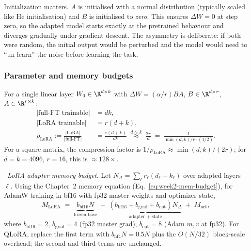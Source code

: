 Initialization matters. $A$ is initialised with a normal distribution
(typically scaled like He initialisation) and $B$ is initialised to
\emph{zero}. This ensures $\Delta W = 0$ at step zero, so the
adapted model starts exactly at the pretrained behaviour and
diverges gradually under gradient descent. The asymmetry is deliberate:
if both were random, the initial output would be perturbed and the
model would need to ``un-learn'' the noise before learning the task.

\subsubsection{Parameter and memory budgets}

\begin{derivation}
For a single linear layer $W_0 \in \R^{d\times k}$ with
$\Delta W = (\alpha/r) BA$, $B \in \R^{d\times r}$, $A \in \R^{r\times k}$:
\begin{align*}
  |\text{full-FT trainable}| &= dk, \\
  |\text{LoRA trainable}| &= r(d+k), \\
  \rho_{\mathrm{LoRA}} := \frac{|\text{LoRA}|}{|\text{full-FT}|}
  &= \frac{r(d+k)}{dk}
     \;\stackrel{d \approx k}{\approx}\; \frac{2r}{d}
     \;=\; \frac{1}{\min(d,k)/r \cdot (1/2)}.
\end{align*}
For a square matrix, the compression factor is
$1/\rho_{\mathrm{LoRA}} \approx \min(d,k)/(2r)$; for
$d=k=4096$, $r=16$, this is $\approx 128\times$.
\end{derivation}

\Ident\ \emph{LoRA adapter memory budget.} Let $N_{\Delta} = \sum_\ell r_\ell
(d_\ell + k_\ell)$ over adapted layers $\ell$. Using the Chapter~2 memory
equation (Eq.~\eqref{eq:week2-mem-budget}), for AdamW training in bf16
with fp32 master weights and optimizer state,
\begin{equation}
  M_{\mathrm{LoRA}}
  \;=\;
  \underbrace{b_{\mathrm{bf16}} N}_{\text{frozen base}}
  \;+\;
  \underbrace{(b_{\mathrm{bf16}} + b_{\mathrm{grad}}
            + b_{\mathrm{opt}}) N_{\Delta}}_{\text{adapter + state}}
  \;+\; M_{\mathrm{act}},
  \label{eq:week7-lora-mem}
\end{equation}
where $b_{\mathrm{bf16}}=2$, $b_{\mathrm{grad}}=4$ (fp32 master grad),
$b_{\mathrm{opt}}=8$ (Adam $m,v$ at fp32). For QLoRA, replace the
first term with $b_{\mathrm{nf4}} N = 0.5 N$ plus the $O(N/32)$
block-scale overhead; the second and third terms are unchanged.

